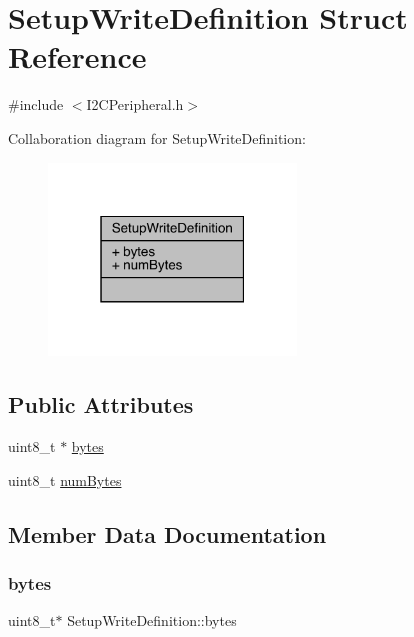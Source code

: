 \hypertarget{struct_setup_write_definition}{}\section{Setup\+Write\+Definition Struct Reference}
\label{struct_setup_write_definition}


{\ttfamily \#include $<$I2\+C\+Peripheral.\+h$>$}



Collaboration diagram for Setup\+Write\+Definition\+:\nopagebreak
\begin{figure}[H]
\begin{center}
\leavevmode
\includegraphics[width=187pt]{struct_setup_write_definition__coll__graph}
\end{center}
\end{figure}
\subsection*{Public Attributes}
\begin{DoxyCompactItemize}
\item 
uint8\+\_\+t $\ast$ \mbox{\hyperlink{struct_setup_write_definition_ac481b18396a89bfa8e9b4960316fb96e}{bytes}}
\item 
uint8\+\_\+t \mbox{\hyperlink{struct_setup_write_definition_ac106abf7ef3fbc971150c5ed427a8761}{num\+Bytes}}
\end{DoxyCompactItemize}


\subsection{Member Data Documentation}
\mbox{\label{struct_setup_write_definition_ac481b18396a89bfa8e9b4960316fb96e}} 
\subsubsection{\texorpdfstring{bytes}{bytes}}
{\footnotesize\ttfamily uint8\+\_\+t$\ast$ Setup\+Write\+Definition\+::bytes}

